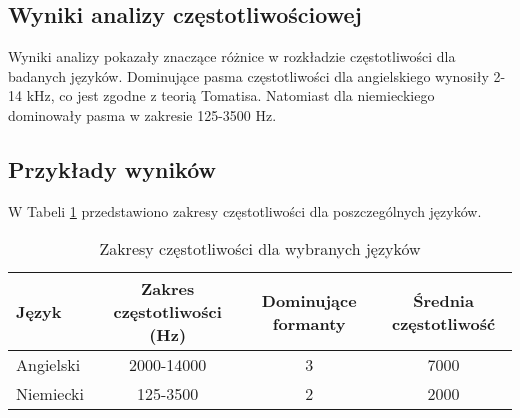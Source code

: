 \subsection{Wyniki analizy częstotliwościowej}

Wyniki analizy pokazały znaczące różnice w rozkładzie częstotliwości dla badanych języków. Dominujące pasma częstotliwości dla angielskiego wynosiły 2-14 kHz, co jest zgodne z teorią Tomatisa. Natomiast dla niemieckiego dominowały pasma w zakresie 125-3500 Hz.

\subsection{Przykłady wyników}

W Tabeli \ref{tab:freq_ranges} przedstawiono zakresy częstotliwości dla poszczególnych języków.

\begin{table}[h]
    \centering
    \caption{Zakresy częstotliwości dla wybranych języków}
    \begin{tabular}{lccc}
        \toprule
        Język & Zakres częstotliwości (Hz) & Dominujące formanty & Średnia częstotliwość \\
        \midrule
        Angielski & 2000-14000 & 3 & 7000 \\
        Niemiecki & 125-3500 & 2 & 2000 \\
        \bottomrule
    \end{tabular}
    \label{tab:freq_ranges}
\end{table}
